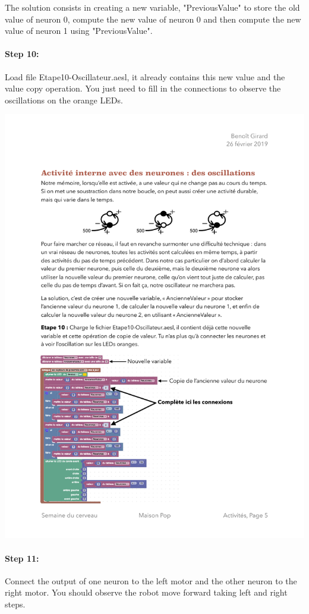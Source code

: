 \documentclass[12pt]{article}
\newcommand{\secondfile}{Etape10-Oscillateur.aesl}
\begin{document}
The solution consists in creating a new variable, "PreviousValue" to store the old value of neuron 0, compute the new value of neuron 0 and then compute the new value of neuron 1 using "PreviousValue".

\paragraph{Step 10:} Load file \secondfile, it already contains this new value and the value copy operation. You just need to fill in the connections to observe the oscillations on the orange LEDs.

\includegraphics{../ProgrammeEtape10.pdf}

\paragraph{Step 11:} Connect the output of one neuron to the left motor and the other neuron to the right motor. You should observe the robot move forward taking left and right steps.
\end{document}
